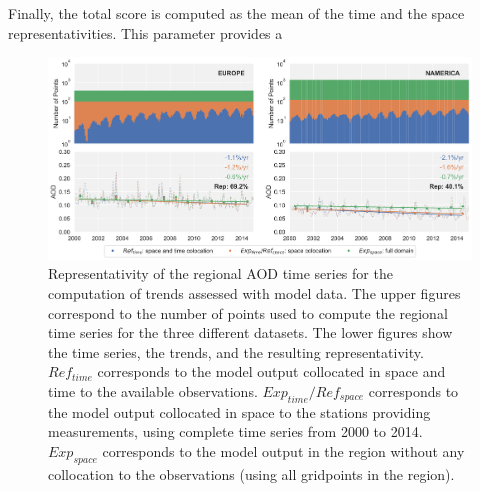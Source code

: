 \documentclass[journal abbreviation, manuscript]{copernicus}
\begin{document}
Finally, the total score is computed as the mean of the time and the space representativities. This parameter provides a

\begin{figure}[t]
 \includegraphics[width=16cm]{../scripts/figs/representativity-od550aer.png}
 \caption{Representativity of the regional AOD time series for the computation of trends assessed with model data. The upper figures correspond to the number of points used to compute the regional time series for the three different datasets. The lower figures show the time series, the trends, and the resulting representativity. $Ref_{time}$ corresponds to the model output collocated in space and time to the available observations. $Exp_{time}/Ref_{space}$ corresponds to the model output collocated in space to the stations providing measurements, using complete time series from 2000 to 2014. $Exp_{space}$ corresponds to the model output in the region without any collocation to the observations (using all gridpoints in the region).}
 \label{fig:representativity}
\end{figure}
\end{document}

